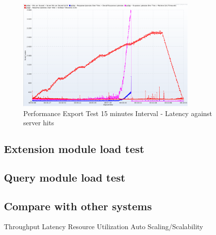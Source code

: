 \begin{figure}[htp]
    \centering
    \includegraphics[width=0.8\textwidth]{results/obs/export/obs_export_15m_res_latencies_against_hits.png}
    \caption{Performance Export Test 15 minutes Interval - Latency against server hits}
    \label{fi:test_obs_export_15m_latency}
\end{figure}

\subsection{Extension module load test}

\subsection{Query module load test}

\subsection{Compare with other systems}

Throughput
Latency
Resource Utilization
Auto Scaling/Scalability
